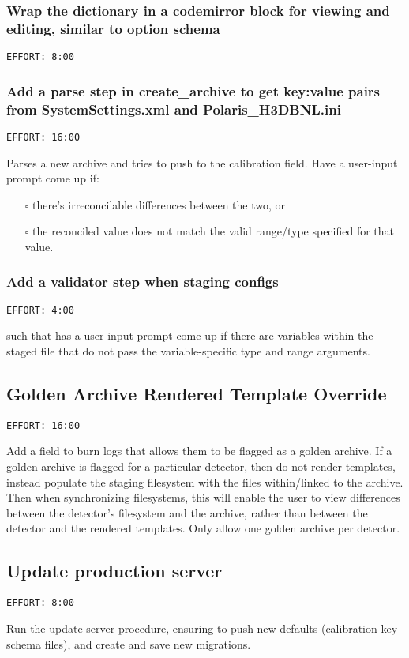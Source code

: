 \documentclass[11pt]{article}
\begin{document}
\subsubsection{Wrap the dictionary in a codemirror block for viewing and editing, similar to option schema}
\label{sec:org54edd52}
\begin{verbatim}
EFFORT: 8:00
\end{verbatim}
\subsubsection{Add a parse step in create\_archive to get key:value pairs from SystemSettings.xml and Polaris\_H3DBNL.ini}
\label{sec:org6fb4466}
\begin{verbatim}
EFFORT: 16:00
\end{verbatim}
Parses a new archive and tries to push to the calibration field. Have a user-input prompt come up if:

\begin{itemize}
\item[{$\square$}] there's irreconcilable differences between the two, or
\item[{$\square$}] the reconciled value does not match the valid range/type specified for that value.
\end{itemize}
\subsubsection{Add a validator step when staging configs}
\label{sec:org084b61b}
\begin{verbatim}
EFFORT: 4:00
\end{verbatim}

such that has a user-input prompt come up if there are variables within the staged file that do not
pass the variable-specific type and range arguments.
\subsection{Golden Archive Rendered Template Override}
\label{sec:orgf1e83a9}
\begin{verbatim}
EFFORT: 16:00
\end{verbatim}
Add a field to burn logs that allows them to be flagged as a golden archive. If a golden archive is
flagged for a particular detector, then do not render templates, instead populate the staging
filesystem with the files within/linked to the archive. Then when synchronizing filesystems, this
will enable the user to view differences between the detector's filesystem and the archive, rather
than between the detector and the rendered templates. Only allow one golden archive per detector.
\subsection{Update production server}
\label{sec:orgdd99de7}
\begin{verbatim}
EFFORT: 8:00
\end{verbatim}
Run the update server procedure, ensuring to push new defaults (calibration key schema files), and
create and save new migrations.
\end{document}
